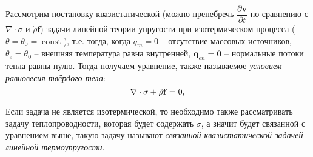 Рассмотрим постановку квазистатической (можно пренебречь
$ \dfrac{\partial \mathbf{v}}{\partial t} $ по сравнению с $\nabla \cdot \sigma$ и
$\mathring{\rho} \mathbf{f}$) задачи линейной теории упругости при изотермическом процесса
($\theta = \theta_0 = \operatorname{const}$), т.е. тогда, когда $q_m = 0$ -- отсутствие массовых
источников, $\theta_e = \theta_0$ -- внешняя температура равна внутренней,
$\mathbf{q}_{en} = \mathbf{0}$ -- нормальные потоки тепла равны нулю. Тогда получаем уравнение,
также называемое \emph{условием равновесия твёрдого тела}:
\[
  \nabla \cdot \sigma + \mathring{\rho} \mathbf{f} = 0, \\
\]

Если задача не является изотермической, то необходимо также рассматривать задачу теплопроводности,
которая будет содержать $\sigma$, а значит будет связанной с уравнением выше, такую задачу
называют \emph{связанной квазистатической задачей линейной термоупругости}.
